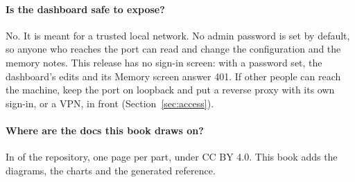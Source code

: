 \paragraph{Is the dashboard safe to expose?} No. It is meant for a trusted local network. No admin password is set by default, so anyone who reaches the port can read and change the configuration and the memory notes. This release has no sign-in screen: with a password set, the dashboard's edits and its Memory screen answer 401. If other people can reach the machine, keep the port on loopback and put a reverse proxy with its own sign-in, or a VPN, in front (Section~\ref{sec:access}).

\paragraph{Where are the docs this book draws on?} In  of the repository, one page per part, under CC BY 4.0. This book adds the diagrams, the charts and the generated reference.
